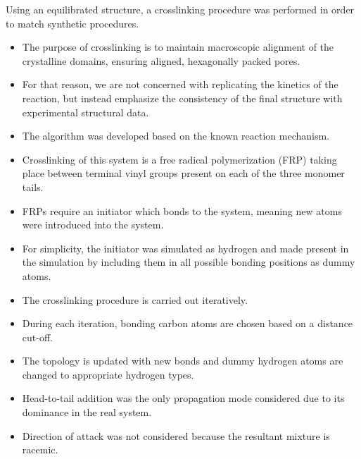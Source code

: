 \documentclass{article}
\newcommand{\angstrom}{\textup{\AA}}
\begin{document}
  Using an equilibrated structure, a crosslinking procedure was performed
  in order to match synthetic procedures. 
  \begin{itemize}
    \item The purpose of crosslinking is to maintain macroscopic alignment of 
    the crystalline domains, ensuring aligned, hexagonally packed pores.
    \item For that reason, we are not concerned with replicating the kinetics 
    of the reaction, but instead emphasize the consistency of the final structure
    with experimental structural data.
    \item The algorithm was developed based on the known reaction mechanism.
    \item Crosslinking of this system is a free radical polymerization (FRP)
    taking place between terminal vinyl groups present on each of the three
    monomer tails.
    \item FRPs require an initiator which bonds to the system, meaning new atoms
    were introduced into the system.
    \item For simplicity, the initiator was simulated as hydrogen and made present 
    in the simulation by including them in all possible bonding positions as dummy atoms.
    \item The crosslinking procedure is carried out iteratively.
    \item During each iteration, bonding carbon atoms are chosen based on a distance cut-off.
    \item The topology is updated with new bonds and dummy hydrogen atoms are 
    changed to appropriate hydrogen types. 
    \item Head-to-tail addition was the only propagation mode considered due to 
    its dominance in the real system.
    \item Direction of attack was not considered because the resultant mixture 
    is racemic.
  \end{itemize}
  
\end{document}
